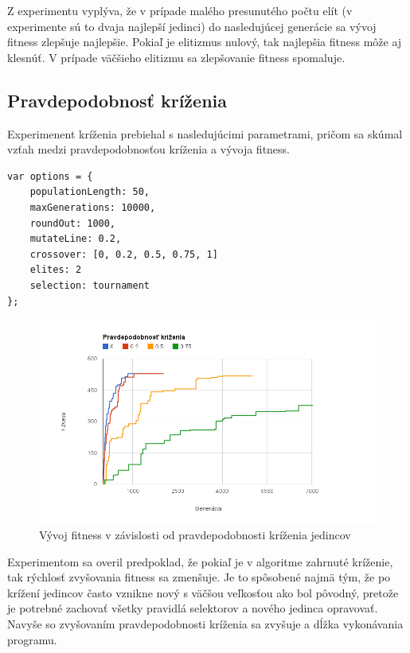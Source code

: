 Z experimentu vyplýva, že v prípade malého presunutého počtu elít (v experimente sú to dvaja najlepší jedinci) do nasledujúcej generácie sa vývoj fitness zlepšuje najlepšie. Pokiaľ je elitizmus nulový, tak najlepšia fitness môže aj klesnúť. V prípade väčšieho elitizmu sa zlepšovanie fitness spomaluje.


\subsection{Pravdepodobnosť kríženia} %
\label{sub:pravdepodobnos_kr_enia}

Experimenent kríženia prebiehal s nasledujúcimi parametrami, pričom sa skúmal vzťah medzi pravdepodobnosťou kríženia a vývoja fitness.

\begin{verbatim}
var options = {
    populationLength: 50,
    maxGenerations: 10000,
    roundOut: 1000,
    mutateLine: 0.2,
    crossover: [0, 0.2, 0.5, 0.75, 1]
    elites: 2
    selection: tournament
};
\end{verbatim}

\begin{figure}[H]
	\centering
	\includegraphics[width=1.0\textwidth]{crossover.png}
	\caption[Vývoj fitness v závislosti od pravdepodobnosti kríženia jedincov]{
		Vývoj fitness v závislosti od pravdepodobnosti kríženia jedincov}
	\label{fig: selection}
\end{figure}

Experimentom sa overil predpoklad, že pokiaľ je v algoritme zahrnuté kríženie, tak rýchlosť zvyšovania fitness sa zmenšuje. Je to spôsobené najmä tým, že po krížení jedincov často vznikne nový s väčšou veľkosťou ako bol pôvodný, pretože je potrebné zachovať všetky pravidlá selektorov a nového jedinca opravovať. Navyše so zvyšovaním pravdepodobnosti kríženia sa zvyšuje a dĺžka vykonávania programu.

